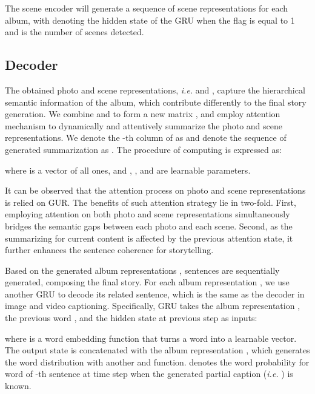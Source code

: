 \documentclass[letterpaper]{article} \usepackage{aaai19}  \usepackage{times}  \usepackage{helvet}  \usepackage{courier}  \usepackage{url}  \usepackage{graphicx}  \usepackage{color}
\begin{document}
The scene encoder will generate a sequence of scene representations  for each album, with  denoting the hidden state of the GRU when the flag  is equal to 1 and  is the number of scenes detected.













\subsection{Decoder}
The obtained  photo and scene representations, \textit{i.e.}  and , capture the hierarchical semantic information of the album, which contribute differently to the final story generation.
We combine  and  to form a new matrix , and employ attention mechanism to dynamically and attentively summarize the photo and scene representations. We denote the -th column of  as  and denote the sequence of generated summarization as  . The procedure of computing   is expressed as:

where  is a vector of all ones, and , ,  and  are learnable parameters.





It can be observed that the attention process on photo and scene representations is relied on GUR. The benefits of such attention strategy lie in two-fold. First, employing attention on both photo and scene representations simultaneously bridges the semantic gaps between each photo and each scene. Second, as the summarizing for current content is affected by the previous attention state, it further enhances the sentence coherence for storytelling.

Based on the generated  album representations ,   sentences are sequentially generated, composing the final story.
For each album representation , we use another GRU to decode its related sentence, which is the same as the decoder in image and video captioning. Specifically, GRU takes the album representation , the previous word , and the hidden state at previous step  as inputs:

where  is a word embedding function that turns a word into a learnable vector.
The output state  is concatenated with the album representation , which generates the word distribution with another  and  function.  denotes the word probability for word  of -th sentence at time step  when the generated partial caption  (\textit{i.e.} ) is known.
\end{document}
